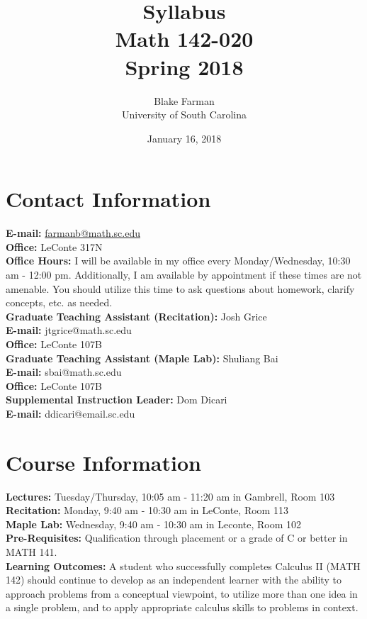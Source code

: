 \documentclass[10pt]{amsart}
\author[Blake Farman]{Blake Farman\\University of South Carolina}
\title[Math 142-020]{Syllabus\\Math 142-020\\Spring 2018}
\date{January 16, 2018}
\begin{document}
\maketitle

\section*{Contact Information}
\noindent
\textbf{E-mail:} \href{mailto:farmanb@math.sc.edu}{farmanb@math.sc.edu}\\
\textbf{Office:} LeConte 317N\\
\textbf{Office Hours:}
I will be available in my office every Monday/Wednesday, 10:30 am - 12:00 pm.
Additionally, I am available by appointment if these times are not amenable.
You should utilize this time to ask questions about homework, clarify concepts, etc. as needed.\\

\noindent\textbf{Graduate Teaching Assistant (Recitation):} Josh Grice\\
\textbf{E-mail:} jtgrice@math.sc.edu\\
\textbf{Office:} LeConte 107B\\

\noindent\textbf{Graduate Teaching Assistant (Maple Lab):} Shuliang Bai\\
\textbf{E-mail:} sbai@math.sc.edu\\
\textbf{Office:} LeConte 107B\\

\noindent\textbf{Supplemental Instruction Leader:} Dom Dicari\\
\textbf{E-mail:} ddicari@email.sc.edu\\

\section*{Course Information}
\noindent
\textbf{Lectures:}
Tuesday/Thursday,  10:05 am - 11:20 am in Gambrell, Room 103\\
\textbf{Recitation:}
Monday, 9:40 am - 10:30 am in LeConte, Room 113\\
\textbf{Maple Lab:}
Wednesday, 9:40 am - 10:30 am in Leconte, Room 102\\

\noindent\textbf{Pre-Requisites:} Qualification through placement or a grade of C or better in MATH 141.\\

\noindent\textbf{Learning Outcomes:} A student who successfully completes Calculus II (MATH 142) should continue to develop as an independent learner with the  ability to approach problems from a conceptual viewpoint, to utilize more than one idea in a single problem, and to apply appropriate calculus skills to problems in context.
\end{document}
